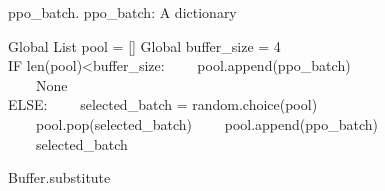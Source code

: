 \begin{figure*}[htbp]
\begin{algorithm}[H]
\caption{Buffer.substitute}
\label{alg:buffer}
\begin{algorithmic}[1]
\Require ppo\_batch.
\Ensure ppo\_batch: A dictionary

\State Global List pool = []
\State Global buffer\_size = 4 \\
IF len(pool)<buffer\_size:
\State \ \ \ \ pool.append(ppo\_batch) \\
\ \ \ \ \Return None \\
ELSE:
\State\ \ \ \ selected\_batch = random.choice(pool) 
\State\ \ \ \ pool.pop(selected\_batch) 
\State\ \ \ \ pool.append(ppo\_batch) \\
\ \ \ \ \Return selected\_batch 
\end{algorithmic}
\end{algorithm}
\end{figure*}

